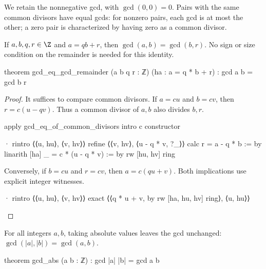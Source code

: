 We retain the nonnegative gcd, with $\gcd(0,0)=0$.
Pairs with the same common divisors have equal gcds: for nonzero pairs,
each gcd is at most the other; a zero pair is characterized by having zero
as a common divisor.

\begin{lemma} \label{nt:thm:gcd-remainder}
  If $a,b,q,r\in\Z$ and $a=qb+r$, then $\gcd(a,b)=\gcd(b,r)$. No sign or size condition on the remainder is needed for this identity.

  \begin{lean}
    theorem gcd_eq_gcd_remainder (a b q r : ℤ) (ha : a = q * b + r) :
        gcd a b = gcd b r
  \end{lean}
\end{lemma}

\begin{proof}

  It suffices to compare common divisors. If $a=cu$ and $b=cv$, then $r=c(u-qv)$. Thus a common divisor of $a,b$ also divides $b,r$.

  \begin{lean}
    apply gcd_eq_of_common_divisors
    intro c
    constructor

    · rintro ⟨⟨u, hu⟩, ⟨v, hv⟩⟩
      refine ⟨⟨v, hv⟩, ⟨u - q * v, ?_⟩⟩
      calc
        r = a - q * b := by
          linarith [ha]
        _ = c * (u - q * v) := by
          rw [hu, hv]
          ring
  \end{lean}

  Conversely, if $b=cu$ and $r=cv$, then $a=c(qu+v)$. Both implications use explicit integer witnesses.

  \begin{lean}
    · rintro ⟨⟨u, hu⟩, ⟨v, hv⟩⟩
      exact ⟨⟨q * u + v, by
        rw [ha, hu, hv]
        ring⟩, ⟨u, hu⟩⟩
  \end{lean}

\end{proof}

\begin{lemma} \label{nt:thm:gcd-abs}
  For all integers $a,b$, taking absolute values leaves the gcd unchanged: $\gcd(|a|,|b|)=\gcd(a,b)$.

  \begin{lean}
    theorem gcd_abs (a b : ℤ) : gcd |a| |b| = gcd a b
  \end{lean}
\end{lemma}

